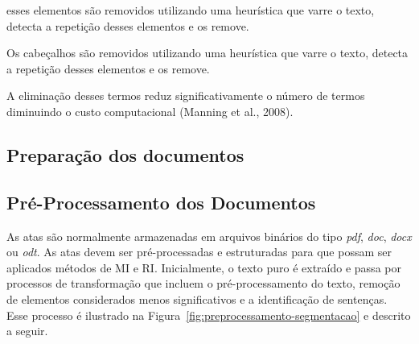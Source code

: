 esses elementos são removidos utilizando uma heurística que varre o texto, detecta a repetição desses elementos e os remove.


Os cabeçalhos são removidos utilizando uma heurística que varre o texto, detecta a repetição desses elementos e os remove.

A eliminação desses termos reduz significativamente o número de termos diminuindo o custo computacional (Manning et al., 2008).































\subsection{Preparação dos documentos}




\subsection{Pré-Processamento dos Documentos}

As atas são normalmente armazenadas em arquivos binários do tipo \textit{pdf}, \textit{doc}, \textit{docx} ou \textit{odt}. As atas devem ser pré-processadas e estruturadas para que possam ser aplicados métodos de MI e RI. Inicialmente, o texto puro é extraído e passa por processos de transformação que incluem o pré-processamento do texto, remoção de elementos considerados menos significativos e a identificação de sentenças. Esse processo é ilustrado na Figura~\ref{fig:preprocessamento-segmentacao} e descrito a seguir.

